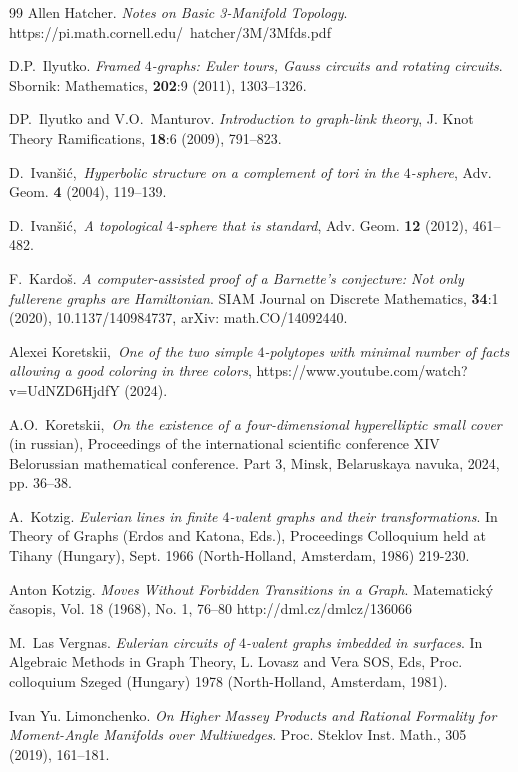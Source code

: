 \documentclass[12pt]{amsart}
\theoremstyle{definition}
\theoremstyle{remark}
\begin{document}
\begin{thebibliography}{99}
Allen Hatcher.
\emph{Notes on Basic 3-Manifold Topology}.
https://pi.math.cornell.edu/~hatcher/3M/3Mfds.pdf

D.P.~Ilyutko.
\emph{Framed $4$-graphs: Euler tours, Gauss circuits and rotating circuits}.
Sbornik: Mathematics, {\bf 202}:9 (2011), 1303--1326.

DP.~Ilyutko and V.O.~Manturov. 
\emph{Introduction to graph-link theory}, 
J. Knot Theory Ramifications, {\bf 18}:6 (2009), 791--823.

D.~Ivan\v{s}i\'c,\,
\emph{Hyperbolic structure on a complement of tori in the $4$-sphere},
Adv. Geom. {\bf 4} (2004), 119--139.

D.~Ivan\v{s}i\'c,\,
\emph{A topological $4$-sphere that is standard},
Adv. Geom. {\bf 12} (2012), 461--482.

F.~Kardo\v{s}. 
\emph{A computer-assisted proof of a Barnette's conjecture: Not only fullerene graphs are Hamiltonian}. 
SIAM Journal on Discrete Mathematics, {\bf 34}:1 (2020), 10.1137/140984737, arXiv: math.CO/14092440.


Alexei Koretskii,\,
\emph{One of the two simple $4$-polytopes with minimal number 
of facts allowing a good coloring in three colors},
https://www.youtube.com/watch?v=UdNZD6HjdfY (2024).

A.O.~Koretskii,\,
\emph{On the existence of a four-dimensional hyperelliptic small cover} (in russian),
Proceedings of the international scientific conference XIV Belorussian mathematical conference. Part 3, Minsk,
Belaruskaya navuka, 2024, pp. 36--38.


A.~Kotzig.
\emph{Eulerian lines in finite $4$-valent graphs and their transformations}. 
In Theory of Graphs (Erdos and Katona, Eds.), Proceedings Colloquium held at Tihany (Hungary), Sept. 1966
(North-Holland, Amsterdam, 1986) 219-230.

Anton Kotzig.
\emph{Moves Without Forbidden Transitions in a Graph}.
Matematick\'{y} \v{c}asopis, Vol. 18 (1968), No. 1, 76--80
http://dml.cz/dmlcz/136066

M.~Las Vergnas.
\emph{Eulerian circuits of $4$-valent graphs imbedded in surfaces}.
In Algebraic Methods in Graph Theory, L. Lovasz and Vera SOS, Eds, Proc. colloquium Szeged (Hungary) 1978
(North-Holland, Amsterdam, 1981).

Ivan Yu. Limonchenko. 
\emph{On Higher Massey Products and Rational Formality for Moment-Angle Manifolds over Multiwedges}.
Proc. Steklov Inst. Math., 305 (2019), 161--181.


\end{thebibliography}
\end{document}

